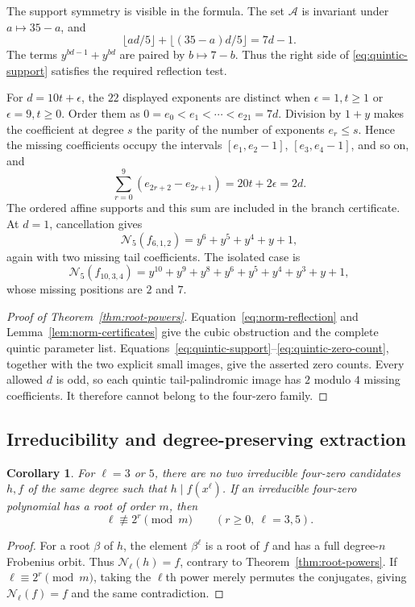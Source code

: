 \documentclass[11pt]{article}
\newtheorem{corollary}[proposition]{Corollary}
\theoremstyle{definition}
\theoremstyle{remark}
\begin{document}
The support symmetry is visible in the formula. The set
$\mathcal A$ is invariant under $a\mapsto35-a$, and
\[
 \lfloor ad/5\rfloor+\lfloor(35-a)d/5\rfloor=7d-1.
\]
The terms $y^{bd-1}+y^{bd}$ are paired by $b\mapsto7-b$.
Thus the right side of \eqref{eq:quintic-support} satisfies
the required reflection test.

For $d=10t+\epsilon$, the $22$ displayed exponents are distinct
when $\epsilon=1,t\ge1$ or $\epsilon=9,t\ge0$.
Order them as $0=e_0<e_1<\cdots<e_{21}=7d$.
Division by $1+y$ makes the coefficient at degree $s$ the parity
of the number of exponents $e_r\le s$. Hence the missing coefficients
occupy the intervals $[e_1,e_2-1]$, $[e_3,e_4-1]$, and so on, and
\begin{equation}\label{eq:quintic-zero-count}
 \sum_{r=0}^{9}(e_{2r+2}-e_{2r+1})
     =20t+2\epsilon=2d.
\end{equation}
The ordered affine supports and this sum are included in the
branch certificate. At $d=1$, cancellation gives
\[
 \mathcal N_5(f_{6,1,2})=y^6+y^5+y^4+y+1,
\]
again with two missing tail coefficients.
The isolated case is
\[
 \mathcal N_5(f_{10,3,4})
   =y^{10}+y^9+y^8+y^6+y^5+y^4+y^3+y+1,
\]
whose missing positions are $2$ and $7$.

\begin{proof}[Proof of Theorem~\ref{thm:root-powers}]
Equation~\eqref{eq:norm-reflection} and
Lemma~\ref{lem:norm-certificates} give the cubic obstruction and
the complete quintic parameter list.
Equations~\eqref{eq:quintic-support}--\eqref{eq:quintic-zero-count},
together with the two explicit small images, give the asserted
zero counts. Every allowed $d$ is odd, so each quintic
tail-palindromic image has $2$ modulo $4$ missing coefficients.
It therefore cannot belong to the four-zero family.
\end{proof}

\subsection{Irreducibility and degree-preserving extraction}
\begin{corollary}\label{cor:root-extraction}
For $\ell=3$ or $5$, there are no two irreducible four-zero
candidates $h,f$ of the same degree such that $h\mid f(x^\ell)$.
If an irreducible four-zero polynomial has a root of order $m$, then
\[
 \ell\not\equiv2^r\pmod m\qquad(r\ge0,\ \ell=3,5).
\]
\end{corollary}
\begin{proof}
For a root $\beta$ of $h$, the element $\beta^\ell$ is a root
of $f$ and has a full degree-$n$ Frobenius orbit.
Thus $\mathcal N_\ell(h)=f$, contrary to
Theorem~\ref{thm:root-powers}. If $\ell\equiv2^r\pmod m$,
taking the $\ell$th power merely permutes the conjugates, giving
$\mathcal N_\ell(f)=f$ and the same contradiction.
\end{proof}
\end{document}
